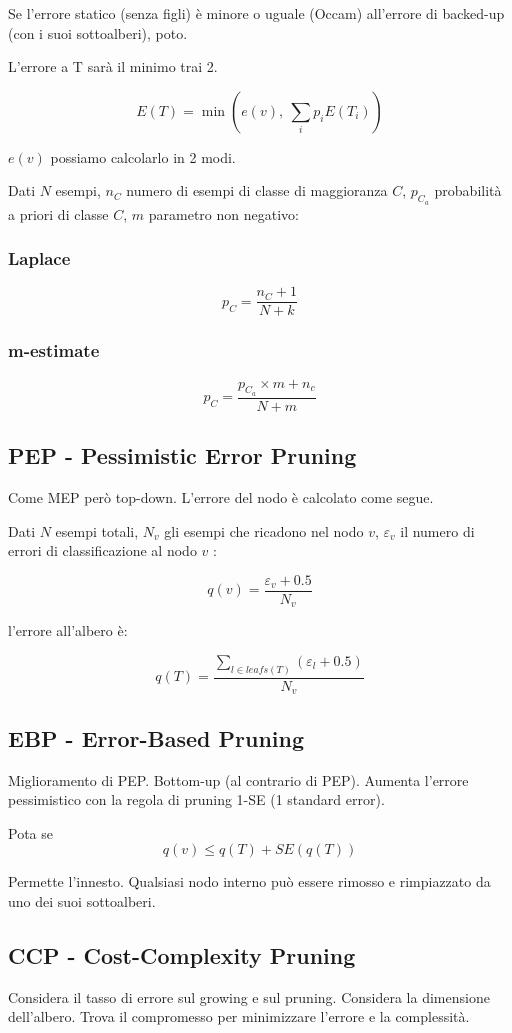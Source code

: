 \documentclass[11pt,onecolumn,a4paper,oneside]{book}
\begin{document}
Se l'errore statico (senza figli) è minore o uguale (Occam) all'errore di backed-up (con i suoi sottoalberi), poto.

L'errore a T sarà il minimo trai 2.

$$ E(T) = \min \left( e \left( v \right), ~ \sum_i p_i E \left( T_i \right) \right) $$

$e(v)$ possiamo calcolarlo in 2 modi.

Dati $N$ esempi, $n_C$ numero di esempi di classe di maggioranza $C$, $p_{C_a}$ probabilità a priori di classe $C$, $m$ parametro non negativo:

\subsubsection{Laplace}
$$ p_C = \frac{n_C +1}{N+k}$$

\subsubsection{m-estimate}
$$ p_C = \frac{p_{C_a} \times m + n_c}{N+m} $$


\subsection{PEP - Pessimistic Error Pruning}
Come MEP però top-down. L'errore del nodo è calcolato come segue.

Dati $N$ esempi totali, $N_v$ gli esempi che ricadono nel nodo $v$, $\varepsilon_v$ il numero di errori di classificazione al nodo $v$ :

$$ q(v) = \frac{\varepsilon_v + 0.5}{N_v}$$

l'errore all'albero è:

$$ q(T) = \frac{\sum_{l \in leafs(T)} \left( \varepsilon_l + 0.5 \right) }{N_v}$$

\subsection{EBP - Error-Based Pruning}
Miglioramento di PEP.
Bottom-up (al contrario di PEP). Aumenta l'errore pessimistico con la regola di pruning 1-SE (1 standard error).

Pota se $$q(v) \leq q(T) + SE \left( q(T) \right)$$

Permette l'innesto. Qualsiasi nodo interno può essere rimosso e rimpiazzato da uno dei suoi sottoalberi.


\subsection{CCP - Cost-Complexity Pruning}
Considera il tasso di errore sul growing e sul pruning. Considera la dimensione dell'albero. Trova il compromesso per minimizzare l'errore e la complessità.
\end{document}
